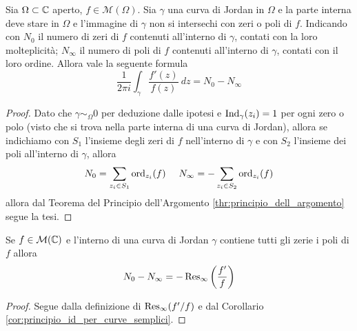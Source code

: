 \begin{corollary}
  Sia $\Omega \subset \mathbb{C}$ aperto, $f \in \mathcal{M}(\Omega)$. Sia $\gamma$ una
  curva di Jordan in $\Omega$ e la parte interna deve stare in $\Omega$
  e l'immagine di $\gamma$ non si intersechi con zeri o poli di $f$. Indicando
  con $N_0$ il numero di zeri di $f$ contenuti all'interno di $\gamma$, 
  contati con la loro molteplicità; $N_\infty$ il numero di poli di $f$
  contenuti all'interno di $\gamma$, contati con il loro ordine. Allora vale la
  seguente formula
  \begin{equation*}
    \frac{1}{2 \pi i} \int_{\gamma} \frac{f'(z)}{f(z)}\ dz = N_0 - N_\infty
  \end{equation*}
  \label{cor:principio_id_per_curve_semplici}
\end{corollary}
\begin{proof}
  Dato che $\gamma \sim_\Omega 0$ per deduzione dalle ipotesi
  e $\operatorname{Ind}_{\gamma}(z_i) = 1$ per ogni zero o polo (visto che si trova nella
  parte interna di una curva di Jordan), allora se indichiamo con $S_1$
  l'insieme degli zeri di $f$ nell'interno di $\gamma$ e con $S_2$ l'insieme
  dei poli all'interno di $\gamma$, allora  
  \begin{equation*}
    N_0 = \sum_{z_i \in S_1} \operatorname{ord}_{z_i}(f) \quad\ N_\infty = - \sum_{z_i \in
    S_2} \operatorname{ord}_{z_i}(f)
  \end{equation*}
  allora dal Teorema del Principio dell'Argomento
  \ref{thr:principio_dell_argomento} segue la tesi.
\end{proof}

\begin{corollary}
  Se $f \in \mathcal{M}(\mathbb{C})$ e l'interno di una curva di Jordan $\gamma$
  contiene tutti gli zerie i poli di $f$ allora
  \begin{equation*}
    N_0 - N_\infty = - \operatorname{Res}_\infty\left( \frac{f'}{f} \right)
  \end{equation*}
  \label{cor:residuo_infinito_rispetto_all_ordine}
\end{corollary}
\begin{proof}
  Segue dalla definizione di $\operatorname{Res}_\infty(f'/f)$ e dal Corollario
  \ref{cor:principio_id_per_curve_semplici}.
\end{proof}

